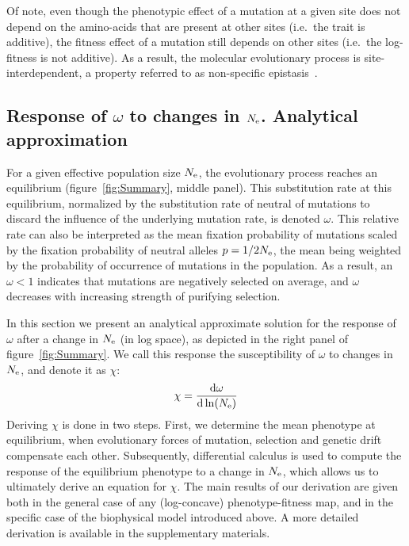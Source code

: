 Of note, even though the phenotypic effect of a mutation at a given site does not depend on the amino-acids that are present at other sites (i.e.~the trait is additive), the fitness effect of a mutation still depends on other sites (i.e.~the log-fitness is not additive).
As a result, the molecular evolutionary process is site-interdependent, a property referred to as non-specific epistasis~\citep{Starr2016,Dasmeh2018}.

\subsection{Response of $\omega$ to changes in $N_{\text{e}}$. Analytical approximation}

For a given {effective population size} $N_{\text{e}}$, the evolutionary process reaches an equilibrium (figure~\ref{fig:Summary}, middle panel).
This {substitution} rate at this equilibrium, normalized by the {substitution} rate of {neutral} of mutations to discard the influence of the underlying mutation rate, is denoted $\omega$.
This relative rate can also be interpreted as the mean fixation probability of mutations scaled by the fixation probability of {neutral} {alleles} $p = 1 / {2 N_{\text{e}}}$, the mean being weighted by the probability of occurrence of mutations in the population.
As a result, an $\omega < 1$ indicates that mutations are negatively selected on average, and $\omega$ decreases with increasing strength of purifying selection.

In this section we present an analytical approximate solution for the response of $\omega$ after a change in $N_{\text{e}}$ (in log space), as depicted in the right panel of figure~\ref{fig:Summary}.
We call this response the susceptibility of $\omega$ to changes in $N_{\text{e}}$, and denote it as $\chi$:
\begin{align}
    \chi = \frac{ \der \omega}{\der \ln (\Ne)} \label{eq:chi}
\end{align}
Deriving $\chi$ is done in two steps.
First, we determine the mean {phenotype} at equilibrium, when evolutionary forces of mutation, selection and {genetic drift} compensate each other.
Subsequently, differential calculus is used to compute the response of the equilibrium {phenotype} to a change in $N_{\text{e}}$, which allows us to ultimately derive an equation for $\chi$.
The main results of our derivation are given both in the general case of any (log-concave) phenotype-fitness map, and in the specific case of the biophysical model introduced above.
A more detailed derivation is available in the supplementary materials.

